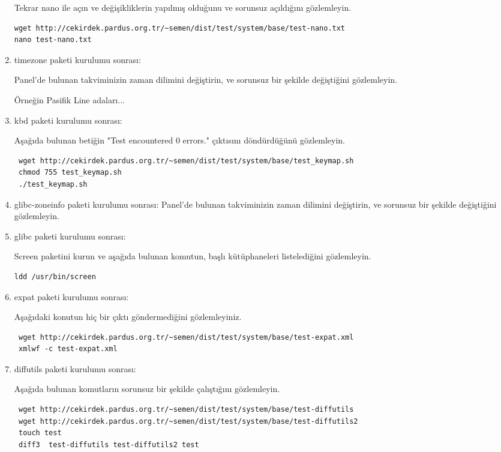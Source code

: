 \documentclass[a4paper,10pt]{article}
\begin{document}
\begin{enumerate}
Tekrar nano ile açın ve değişikliklerin yapılmış olduğunu ve sorunsuz açıldığını gözlemleyin.
\begin{verbatim}
wget http://cekirdek.pardus.org.tr/~semen/dist/test/system/base/test-nano.txt 
nano test-nano.txt
\end{verbatim}


\item timezone paketi kurulumu sonrası:

Panel'de bulunan takviminizin zaman dilimini değiştirin, ve sorunsuz bir şekilde değiştiğini gözlemleyin.

Örneğin Pasifik Line adaları...

\item kbd paketi kurulumu sonrası:

Aşağıda bulunan betiğin "Test encountered 0 errors." çıktısını döndürdüğünü gözlemleyin.
\begin{verbatim}
 wget http://cekirdek.pardus.org.tr/~semen/dist/test/system/base/test_keymap.sh
 chmod 755 test_keymap.sh
 ./test_keymap.sh
\end{verbatim}



\item glibc-zoneinfo paketi kurulumu sonrası:
Panel'de bulunan takviminizin zaman dilimini değiştirin, ve sorunsuz bir şekilde değiştiğini gözlemleyin.

\item glibc paketi kurulumu sonrası:

Screen paketini kurun ve aşağıda bulunan komutun, başlı kütüphaneleri listelediğini gözlemleyin.
\begin{verbatim}
ldd /usr/bin/screen 
\end{verbatim}

\item expat paketi kurulumu sonrası:

Aşağıdaki konutun hiç bir çıktı göndermediğini gözlemleyiniz.
\begin{verbatim}
 wget http://cekirdek.pardus.org.tr/~semen/dist/test/system/base/test-expat.xml
 xmlwf -c test-expat.xml
\end{verbatim}

\item diffutils paketi kurulumu sonrası:

Aşağıda bulunan komutların sorunsuz bir şekilde çalıştığını gözlemleyin.
\begin{verbatim}
 wget http://cekirdek.pardus.org.tr/~semen/dist/test/system/base/test-diffutils
 wget http://cekirdek.pardus.org.tr/~semen/dist/test/system/base/test-diffutils2
 touch test
 diff3  test-diffutils test-diffutils2 test 
\end{verbatim}


\end{enumerate}
\end{document}
